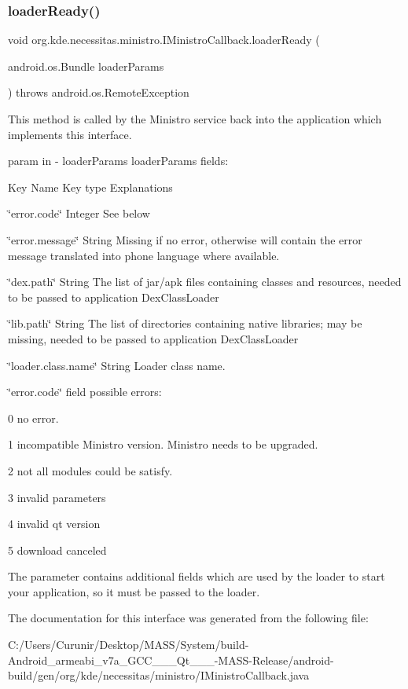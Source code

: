 \subsubsection{\texorpdfstring{loader\+Ready()}{loaderReady()}}
{\footnotesize\ttfamily void org.\+kde.\+necessitas.\+ministro.\+I\+Ministro\+Callback.\+loader\+Ready (\begin{DoxyParamCaption}\item[{android.\+os.\+Bundle}]{loader\+Params }\end{DoxyParamCaption}) throws android.\+os.\+Remote\+Exception}

This method is called by the Ministro service back into the application which implements this interface.

param in -\/ loader\+Params loader\+Params fields\+:
\begin{DoxyItemize}
\item Key Name Key type Explanations
\item \char`\"{}error.\+code\char`\"{} Integer See below
\item \char`\"{}error.\+message\char`\"{} String Missing if no error, otherwise will contain the error message translated into phone language where available.
\item \char`\"{}dex.\+path\char`\"{} String The list of jar/apk files containing classes and resources, needed to be passed to application Dex\+Class\+Loader
\item \char`\"{}lib.\+path\char`\"{} String The list of directories containing native libraries; may be missing, needed to be passed to application Dex\+Class\+Loader
\item \char`\"{}loader.\+class.\+name\char`\"{} String Loader class name.
\end{DoxyItemize}

\char`\"{}error.\+code\char`\"{} field possible errors\+:
\begin{DoxyItemize}
\item 0 no error.
\item 1 incompatible Ministro version. Ministro needs to be upgraded.
\item 2 not all modules could be satisfy.
\item 3 invalid parameters
\item 4 invalid qt version
\item 5 download canceled
\end{DoxyItemize}

The parameter contains additional fields which are used by the loader to start your application, so it must be passed to the loader. 

The documentation for this interface was generated from the following file\+:\begin{DoxyCompactItemize}
\item 
C\+:/\+Users/\+Curunir/\+Desktop/\+M\+A\+S\+S/\+System/build-\/\+Android\+\_\+armeabi\+\_\+v7a\+\_\+\+G\+C\+C\+\_\+\_\+\_\+\+Qt\+\_\+\_\+\_-\/\+M\+A\+S\+S-\/\+Release/android-\/build/gen/org/kde/necessitas/ministro/I\+Ministro\+Callback.\+java\end{DoxyCompactItemize}
